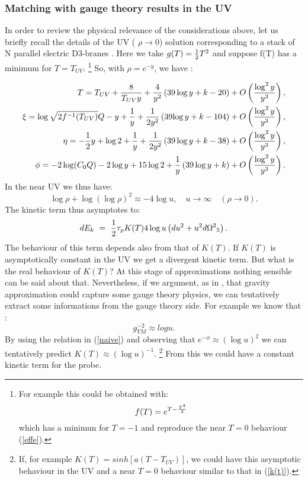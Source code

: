 \documentclass[a4paper,12pt]{article}
\def\half{{1 \over 2}}
\begin{document}
\subsubsection{Matching with gauge theory results in the UV}
In order to review the physical relevance of the considerations above,
let us briefly recall the details of the UV ( $\rho\rightarrow 0$) solution corresponding to a stack of N parallel electric D3-branes \cite{kt0,minahan}. Here we take
$g(T)=\half T^2$ and suppose f(T) has a minimum for $T=T_{UV}$.
\footnote{ For example this could be obtained with:
\begin{equation}
f(T)=e^{T-{T^3\over 3}}
\end{equation}
which has a minimun for $T=-1$ and reproduce the near $T=0$ behaviour (\ref{effe}).}
So, with $\rho=e^{-y}$, we have \cite{minahan,maggiore}:

\begin{eqnarray}
T=T_{UV}+{8\over T_{UV}y}+ {4\over y^2}\left(39\log y + k -20\right) + O\left({\log^2y\over y^3}\right),
\nonumber \\
\xi={\log \sqrt{2f^{-1}(T_{UV})}Q} -y + {1\over y}+ {1\over 2y^2}\left(39{\log y} + k -104\right) + O\left({\log^2y\over y^3}\right),\nonumber \\
\eta= -{\half y}+\log 2 + {1\over y} + {1\over2y^2}\left( 39\log y  + k - 38\right) + O\left({\log^2y\over y^3}\right), \nonumber \\
\phi
 = -2\log(C_{0}Q) -2\log y +15\log2 +{1\over y}\left(39\log y + k\right) +O\left({\log^2y\over y^3}\right).
\label{uvsol}
\end{eqnarray}
In the near UV we thus have:
\begin{equation}
\log\rho + \log(\log\rho)^2 \approx -4\log u, \quad  u\rightarrow\infty \quad  (\rho \rightarrow 0) .
\end{equation}
The kinetic term thus asymptotes to:
\begin{equation}
dE_k~=~{\half \tau_p} K(T)4\log u \left(du^2 + u^2 d{\Omega^2}_5 \right).
\end{equation}
The behaviour of this term depends also from that of $K(T)$. If $K(T)$ is asymptotically constant in the UV we get a divergent kinetic term. But what is the real behaviour of $K(T)$? At this stage of approximations nothing sensible can be said about that. Nevertheless, if we argument, as in \cite{kt}, that gravity approximation could capture some gauge theory physics, we can tentatively extract some informations from the gauge theory side. For example we know that 
\cite{kt1} :
\begin{equation}
g^{-2}_{YM}\approx log u .
\end{equation}
By using the relation in (\ref{naive}) and observing that $e^{-\phi}\approx (\log u)^2$ we can tentatively predict $K(T)\approx (\log u)^{-1}$.
\footnote{If, for example  $K(T)=sinh[a(T-T_{UV})]$, we could have this asymptotic behaviour in the UV and a near $T=0$ behaviour similar to that in (\ref{k(t)}).}
From this we could have a constant kinetic term for the probe.
\end{document}
